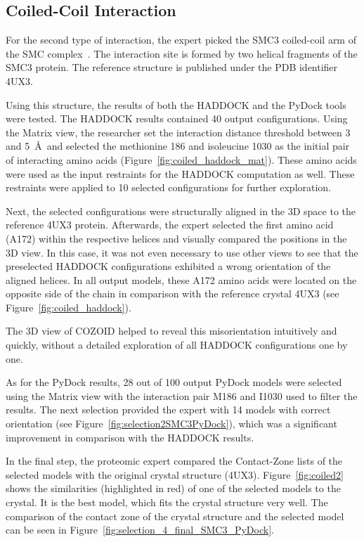 \documentclass{bmcart}
\def\MatView {Matrix view\xspace}
\def\CoZoLists{Contact-Zone lists\xspace}
\begin{document}
\subsection*{Coiled-Coil Interaction}
For the second type of interaction, the expert picked the SMC3 coiled-coil arm of the SMC complex~\cite{Gligoris}.
The interaction site is formed by two helical fragments of the SMC3 protein.
The reference structure is published under the PDB identifier 4UX3.  

Using this structure, the results of both the HADDOCK and the PyDock tools were tested.
The HADDOCK results contained 40 output configurations.
Using the \MatView, the researcher set the interaction distance threshold between 3 and 5~\AA~and selected the methionine 186 and isoleucine 1030 as the initial pair of interacting amino acids (Figure~\ref{fig:coiled_haddock_mat}). 
These amino acids were used as the input restraints for the HADDOCK computation as well.
These restraints were applied to 10 selected configurations for further exploration.

Next, the selected configurations were structurally aligned in the 3D space to the reference 4UX3 protein.
Afterwards, the expert selected the first amino acid (A172) within the respective helices and visually compared the positions in the 3D view.
In this case, it was not even necessary to use other views to see that the preselected HADDOCK configurations exhibited a wrong orientation of the aligned helices. 
In all output models, these A172 amino acids were located on the opposite side of the chain in comparison with the reference crystal 4UX3 (see Figure~\ref{fig:coiled_haddock}).

The 3D view of COZOID helped to reveal this misorientation intuitively and quickly, without a detailed exploration of all HADDOCK configurations one by one.

As for the PyDock results, 28 out of 100 output PyDock models were selected using the \MatView with the interaction pair M186 and I1030 used to filter the results.
The next selection provided the expert with 14 models with correct orientation (see Figure~\ref{fig:selection2SMC3PyDock}), which was a significant improvement in comparison with the HADDOCK results.

In the final step, the proteomic expert compared the \CoZoLists of the selected models with the original crystal structure (4UX3). 
Figure~\ref{fig:coiled2} shows the similarities (highlighted in red) of one of the selected models to the crystal. It is the best model, which fits the crystal structure very well. The comparison of the contact zone of the crystal structure and the selected model can be seen in Figure~\ref{fig:selection_4_final_SMC3_PyDock}.
\end{document}
